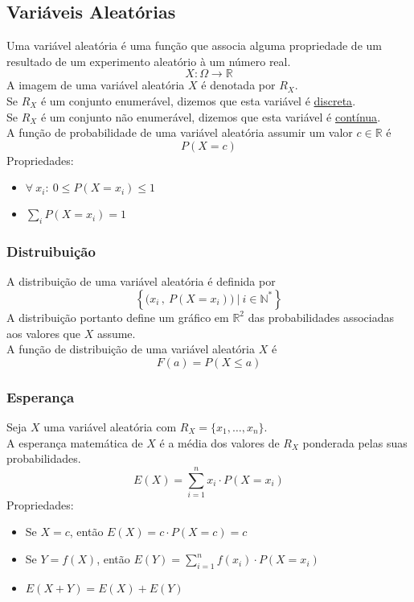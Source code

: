 \documentclass{article}
\begin{document}
\subsection{Variáveis Aleatórias}
Uma variável aleatória é uma função que associa alguma propriedade de um resultado de um experimento aleatório à um número real.
\[ X: \Omega \to \mathbb{R} \]
A imagem de uma variável aleatória $X$ é denotada por $R_X$. \\[5pt]
Se $R_X$ é um conjunto enumerável, dizemos que esta variável é \uline{discreta}. \\
Se $R_X$ é um conjunto não enumerável, dizemos que esta variável é \uline{contínua}. \\[10pt]
A função de probabilidade de uma variável aleatória assumir um valor $c \in \mathbb{R}$ é
\[ P(X = c) \]
Propriedades:
\begin{itemize}
  \item $\forall\: x_i:\> 0 \leq P(X = x_i) \leq 1$
  \item $\sum\limits_i P(X = x_i) = 1$
\end{itemize}

\subsubsection{Distruibuição}
A distribuição de uma variável aleatória é definida por
\[ \left\{ \big( x_i\,,\: P(X = x_i) \big) \:\Big|\: i \in \mathbb{N}^* \right\} \]
A distribuição portanto define um gráfico em $\mathbb{R}^2$ das probabilidades associadas aos valores que $X$ assume. \\[10pt]
A função de distribuição de uma variável aleatória $X$ é
\[ F(a) = P(X \leq a) \]


\pagebreak


\subsubsection{Esperança}
Seja $X$ uma variável aleatória com $R_X = \{x_1, \hdots, x_n\}$. \\
A esperança matemática de $X$ é a média dos valores de $R_X$ ponderada pelas suas probabilidades.
\[ E(X) = \sum_{i=1}^{n} x_i \cdot P(X = x_i) \] %
Propriedades:
\begin{itemize}
  \item Se $X = c$, então $E(X) = c \cdot P(X = c) = c$
  \item Se $Y = f(X)$, então $E(Y) = \sum\limits_{i = 1}^{n} f(x_i) \cdot P(X = x_i)$
  \item $E(X + Y) = E(X) + E(Y)$
\end{itemize}
\end{document}
